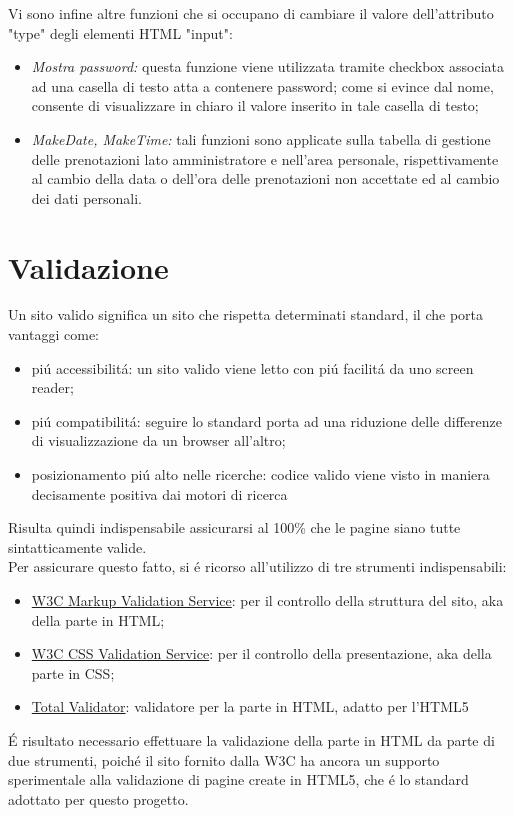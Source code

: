 \documentclass{article}
\begin{document}
Vi sono infine altre funzioni che si occupano di cambiare il valore dell'attributo "type" degli elementi HTML "input":
\begin{itemize}
        \item \textit{Mostra password:} questa funzione viene utilizzata tramite checkbox associata ad una casella di testo atta a contenere password; come si evince dal nome, consente di visualizzare in chiaro il valore inserito in tale casella di testo;
        \item \textit{MakeDate, MakeTime:} tali funzioni sono applicate sulla tabella di gestione delle prenotazioni lato amministratore e nell'area personale, rispettivamente al cambio della data o dell'ora delle prenotazioni non accettate ed al cambio dei dati personali.
\end{itemize}
 
\section{Validazione}
Un sito valido significa un sito che rispetta determinati standard, il che porta vantaggi come:
\begin{itemize}
	\item piú accessibilitá: un sito valido viene letto con piú facilitá da uno screen reader;
	\item piú compatibilitá: seguire lo standard porta ad una riduzione delle differenze di visualizzazione da un browser all'altro;
	\item posizionamento piú alto nelle ricerche: codice valido viene visto in maniera decisamente positiva dai motori di ricerca
\end{itemize}
Risulta quindi indispensabile assicurarsi al 100\% che le pagine siano tutte sintatticamente valide.\\
Per assicurare questo fatto, si é ricorso all'utilizzo di tre strumenti indispensabili:
\begin{itemize}
	\item \href{https://validator.w3.org/}{W3C Markup Validation Service}: per il controllo della struttura del sito, aka della parte in HTML;
	\item \href{https://jigsaw.w3.org/css-validator/}{W3C CSS Validation Service}: per il controllo della presentazione, aka della parte in CSS;
	\item \href{https://www.totalvalidator.com/}{Total Validator}: validatore per la parte in HTML, adatto per l'HTML5
\end{itemize}
É risultato necessario effettuare la validazione della parte in HTML da parte di due strumenti, poiché il sito fornito dalla W3C ha ancora un supporto sperimentale alla validazione di pagine create in HTML5, che é lo standard adottato per questo progetto.
\end{document}

